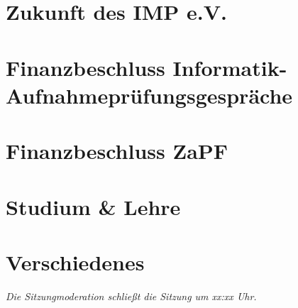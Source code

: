 \documentclass[11pt, fachschaft=mathphys,twosided=true]{mathphys/mathphys-article}
\begin{document}
        \section{Zukunft des IMP e.V.}

\section{Finanzbeschluss Informatik-Aufnahmeprüfungsgespräche}

\section{Finanzbeschluss ZaPF}

\section{Studium \& Lehre}

\section{Verschiedenes}


                \emph{Die Sitzungmoderation schließt die Sitzung um xx:xx Uhr.}
                
\end{document}
